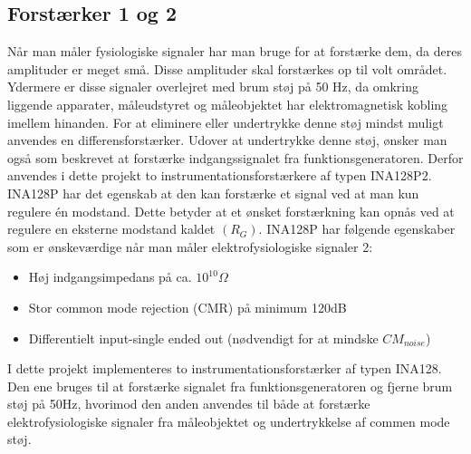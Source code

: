 \subsection{Forstærker 1 og 2}
Når man måler fysiologiske signaler har man bruge for at forstærke dem, da deres amplituder er meget små. Disse amplituder skal forstærkes op til volt området. Ydermere er disse signaler overlejret med brum støj på 50 Hz, da omkring liggende apparater, måleudstyret og måleobjektet har elektromagnetisk kobling imellem hinanden. For at eliminere eller undertrykke denne støj mindst muligt anvendes en differensforstærker. Udover at undertrykke denne støj, ønsker man også som beskrevet at forstærke indgangssignalet fra funktionsgeneratoren. Derfor anvendes i dette projekt to instrumentationsforstærkere af typen INA128P2. INA128P har det egenskab at den kan forstærke et signal ved at man kun regulere én modstand. Dette betyder at et ønsket forstærkning kan opnås ved at regulere  en eksterne modstand kaldet $(R_G)$. INA128P har følgende egenskaber som er ønskeværdige når man måler elektrofysiologiske signaler 2:


\begin{itemize}
\item 	Høj indgangsimpedans på ca. $10^{10} \Omega $
\item	Stor common mode rejection (CMR) på minimum 120dB
\item 	Differentielt input-single ended out (nødvendigt for at mindske $CM_{noise}$)
\end{itemize}

I dette projekt implementeres to instrumentationsforstærker af typen INA128. Den ene bruges til at forstærke signalet fra funktionsgeneratoren og fjerne brum støj på 50Hz, hvorimod den anden anvendes til både at forstærke elektrofysiologiske signaler fra måleobjektet og undertrykkelse af commen mode støj.  

